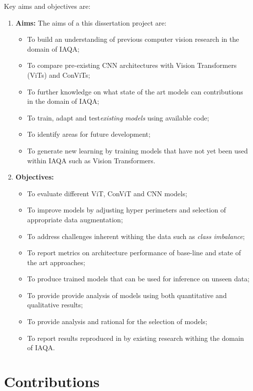 Key aims and objectives are:
\begin{enumerate}
    \item \textbf{Aims:} The aims of a this dissertation project are:
        \begin{itemize}
        \item To build an understanding of previous computer vision research in the domain of IAQA;
        \item To compare pre-existing CNN architectures with Vision Transformers (ViTs) and ConViTs;
        \item To further knowledge on what state of the art models can contributions in the domain of IAQA;
        \item To train, adapt and test\emph{existing models} using available code;
        \item To identify areas for future development;
        \item To generate new learning by training models that have not yet been used within IAQA such as Vision Transformers.
        \end{itemize}
    \item \textbf{Objectives:}
        \begin{itemize}
            \item To evaluate different ViT, ConViT and CNN models;
            \item To improve models by adjusting hyper perimeters and selection of appropriate data augmentation;
            \item To address challenges inherent withing the data such as \emph{class imbalance};
            \item To report metrics on architecture performance of base-line and state of the art approaches;
            \item To produce trained models that can be used for inference on unseen data;
            \item To provide provide analysis of models using both quantitative and qualitative results;
            \item To provide analysis and rational for the selection of models;
            \item To report results reproduced in by existing research withing the domain of IAQA. 
        \end{itemize}
\end{enumerate}

\section{Contributions}

